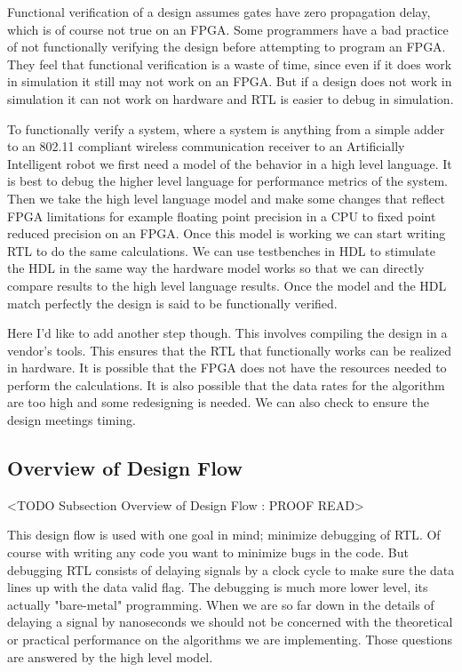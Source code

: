 Functional verification of a design assumes gates have zero propagation delay, which is of course not true on an FPGA. Some programmers have a bad practice of not functionally verifying the design before attempting to program an FPGA. They feel that functional verification is a waste of time, since even if it does work in simulation it still may not work on an FPGA. But if a design does not work in simulation it can not work on hardware and RTL is easier to debug in simulation.

To functionally verify a system, where a system is anything from a simple adder to an 802.11 compliant wireless communication receiver to an Artificially Intelligent robot we first need a model of the behavior in a high level language. It is best to debug the higher level language for performance metrics of the system. Then we take the high level language model and make some changes that reflect FPGA limitations for example floating point precision in a \ac{CPU} to fixed point reduced precision on an FPGA. Once this model is working we can start writing \ac{RTL} to do the same calculations. We can use testbenches in \ac{HDL} to stimulate the \ac{HDL} in the same way the hardware model works so that we can directly compare results to the high level language results. Once the model and the \ac{HDL} match perfectly the design is said to be functionally verified.

Here I'd like to add another step though. This involves compiling the design in a vendor's tools. This ensures that the \ac{RTL} that functionally works can be realized in hardware. It is possible that the FPGA does not have the resources needed to perform the calculations. It is also possible that the data rates for the algorithm are too high and some redesigning is needed. We can also check to ensure the design meetings timing.

		

\subsection{Overview of Design Flow}
	<TODO Subsection Overview of Design Flow : PROOF READ>

This design flow is used with one goal in mind; minimize debugging of \ac{RTL}. Of course with writing any code you want to minimize bugs in the code. But debugging \ac{RTL} consists of delaying signals by a clock cycle to make sure the data lines up with the data valid flag. The debugging is much more lower level, its actually "bare-metal" programming. When we are so far down in the details of delaying a signal by nanoseconds we should not be concerned with the theoretical or practical performance on the algorithms we are implementing. Those questions are answered by the high level model.  
	
